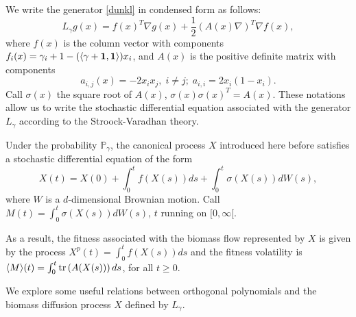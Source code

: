 \documentclass[12pt]{article}
\begin{document}
We write the generator \eqref{dunkl} in condensed form as follows:
\begin{equation}\label{generator-resum}
    L_\gamma g(x)= f(x)^T\nabla g(x)+ \frac{1}{2}(A(x)\nabla)^T\nabla f(x),        
\end{equation}
where $f(x)$ is the column vector with components $f_i(x)=\gamma_i+1-(\langle \gamma+\mathbf{1},\mathbf{1}\rangle)x_i$, and $A(x)$ is the positive definite matrix with components
\[a_{i,j}(x)=-2x_ix_j,\; i\not=j;\; a_{i,i}=2x_i(1-x_i).\]
Call $\sigma(x)$ the square root of $A(x)$, $\sigma(x)\sigma(x)^T=A(x)$.
These notations allow us to write the stochastic differential equation associated with the generator $L_\gamma$ according to the Stroock-Varadhan theory.

\begin{cor}
Under the probability $\mathbb{P}_\gamma$, the canonical process $X$ introduced here before satisfies a stochastic differential equation  of the form 
\begin{equation}\label{diffusion}
X(t)=X(0)+\int_0^tf(X(s))ds+\int_0^t \sigma (X(s))dW(s),
\end{equation}
where $W$ is a $d$-dimensional Brownian motion. Call $M(t)=\int_0^t\sigma (X(s))dW(s)$, $t$ running on $[0,\infty[$.

As a result, the fitness associated with the biomass flow represented by $X$ is given by the process $X^p(t)=\int_0^tf(X(s))ds$ and the fitness volatility is $\langle M\rangle (t)=\int_0^t{\rm tr }\left(A(X(s))\right)ds$, for all $t\geq 0$.

\end{cor}

We explore some useful relations between orthogonal polynomials and the biomass diffusion process $X$ defined by $L_\gamma$.
\end{document}

